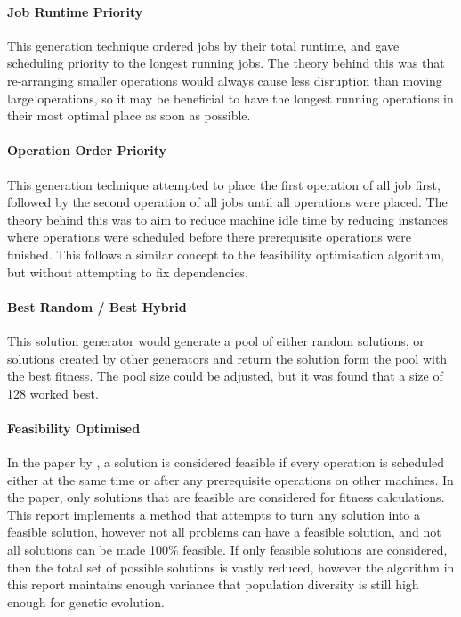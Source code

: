 \documentclass[14pt]{acmsiggraph}
\begin{document}
	\paragraph{Job Runtime Priority}
	This generation technique ordered jobs by their total runtime, and gave  scheduling priority to the longest running jobs. The theory behind this was that re-arranging smaller operations would always cause less disruption than moving large operations, so it may be beneficial to have the longest running operations in their most optimal place as soon as possible.
	
	\paragraph{Operation Order Priority}
	This generation technique attempted to place the first operation of all job first, followed by the second operation of all jobs until all operations were placed. The theory behind this was to aim to reduce machine idle time by reducing instances where operations were scheduled before there prerequisite operations were finished. This follows a similar concept to the feasibility optimisation algorithm, but without attempting to fix dependencies.
	
	\paragraph{Best Random / Best Hybrid}
	This solution generator would generate a pool of either random solutions, or solutions created by other generators and return the solution form the pool with the best fitness. The pool size could be adjusted, but it was found that a size of 128 worked best.
	
	\paragraph{Feasibility Optimised}
	In the paper by \cite{wang2012new}, a solution is considered feasible if every operation is scheduled either at the same time or after any prerequisite operations on other machines. In the paper, only solutions that are feasible are considered for fitness calculations. This report implements a method that attempts to turn any solution into a feasible solution, however not all problems can have a feasible solution, and not all solutions can be made 100\% feasible. If only feasible solutions are considered, then the total set of possible solutions is vastly reduced, however the algorithm in this report maintains enough variance that population diversity is still high enough for genetic evolution. 
	
\end{document}
